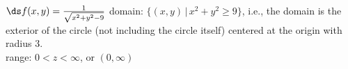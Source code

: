 {$\ds f(x,y) = \frac1{\sqrt{x^2+y^2-9}}$}
{domain: $\{(x,y)\,|\, x^2+y^2\geq 9\}$, i.e., the domain is the exterior of the circle (not including the circle itself) centered at the origin with radius 3.\\
range: $0< z< \infty$, or $(0,\infty)$}